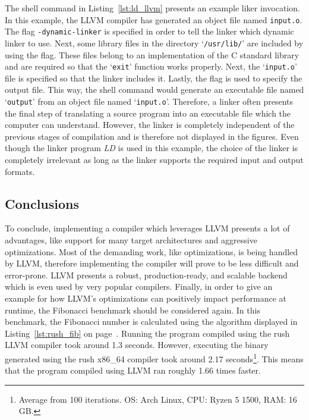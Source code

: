 The shell command in Listing~\ref{lst:ld_llvm} presents an example liker invocation.
In this example, the LLVM compiler has generated an object file named \texttt{input.o}.
The flag \texttt{-dynamic-linker} is specified in order to tell the linker which dynamic linker to use.
Next, some library files in the directory `\texttt{/usr/lib/}' are included by using the  flag.
These files belong to an implementation of the C standard library and are required so that the `\texttt{exit}' function works properly.
Next, the `\texttt{input.o}' file is specified so that the linker includes it.
Lastly, the  flag is used to specify the output file.
This way, the shell command would generate an executable file named `\texttt{output}' from an object file named `\texttt{input.o}'.
Therefore, a linker often presents the final step of translating a source program into an executable file which the computer can understand.
However, the linker is completely independent of the previous stages of compilation and is therefore not displayed in the figures.
Even though the linker program \emph{LD} is used in this example,
the choice of the linker is completely irrelevant as long as the linker supports the required input and output formats.


\subsection{Conclusions}

To conclude, implementing a compiler which leverages LLVM presents a lot of advantages,
like support for many target architectures and aggressive optimizations.
Most of the demanding work, like optimizations, is being handled by LLVM, therefore implementing the compiler will prove to be less difficult and error-prone.
LLVM presents a robust, production-ready, and scalable backend which is even used by very popular compilers.
Finally, in order to give an example for how LLVM's optimizations can positively impact performance at runtime, the Fibonacci benchmark should be considered again.
In this benchmark, the  Fibonacci number is calculated using the algorithm displayed in Listing~\ref{lst:rush_fib} on page~\pageref{lst:rush_fib}.
Running the program compiled using the rush LLVM compiler took around 1.3 seconds.
However, executing the binary generated using the rush x86\_64 compiler took around 2.17 seconds\footnote{Average from 100 iterations. OS: Arch Linux, CPU: Ryzen 5 1500, RAM: 16 GB.}.
This means that the program compiled using LLVM ran roughly 1.66 times faster.
